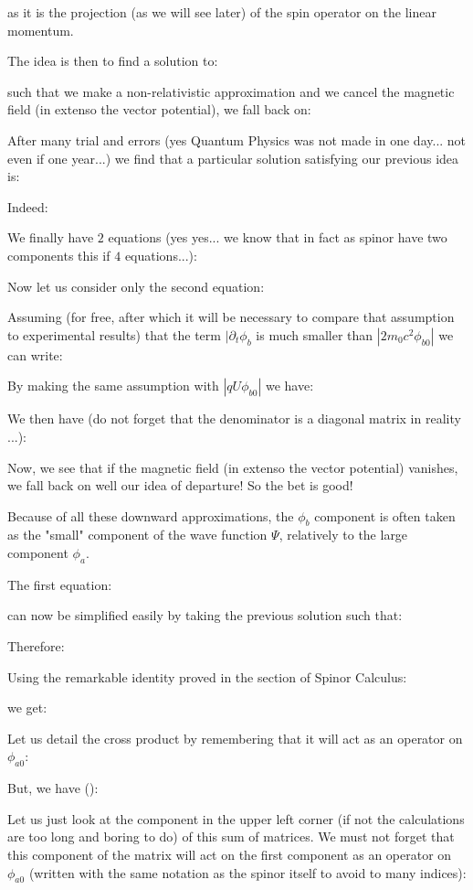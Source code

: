 	as it is the projection (as we will see later) of the spin operator on the linear momentum.
	
	The idea is then to find a solution to:
	
	such that we make a non-relativistic approximation and we cancel the magnetic field (in extenso the vector potential), we fall back on:
	
	After many trial and errors (yes Quantum Physics was not made in one day... not even if one year...) we find that a particular solution satisfying our previous idea is:
	
	Indeed:
	
	We finally have $2$ equations (yes yes... we know that in fact as spinor have two components this if $4$ equations...):
	
	Now let us consider only the second equation:
	
	Assuming (for free, after which it will be necessary to compare that assumption to experimental results) that the term $|\partial_t \phi_b$ is much smaller than $|2m_0c^2\phi_{b0}|$ we can write:
	
	By making the same assumption with $|qU\phi_{b0}|$ we have:
	
	We then have (do not forget that the denominator is a diagonal matrix in reality ...):
	
	Now, we see that if the magnetic field (in extenso the vector potential) vanishes, we fall back on well our idea of departure! So the bet is good!

	Because of all these downward approximations, the $\phi_b$ component is often taken as the "small" component of the wave function $\Psi$, relatively to the large component $\phi_a$.

	The first equation:
	
	can now be simplified easily by taking the previous solution such that:
	
	Therefore:
	
	Using the remarkable identity proved in the section of Spinor Calculus:
	
	we get:
	
	Let us detail the cross product by remembering that it will act as an operator on $\phi_{a0}$:
	
	But, we have ():
	
	Let us just look at the component in the upper left corner (if not the calculations are too long and boring to do) of this sum of matrices. We must not forget that this component of the matrix will act on the first component as an operator on $\phi_{a0}$ (written with the same notation as the spinor itself to avoid to many indices):
	
